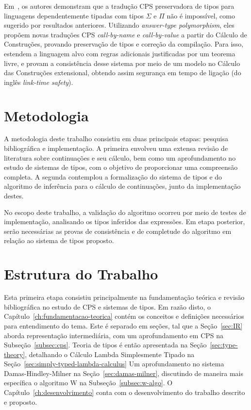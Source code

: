 Em~\cite{bowman2018cps}, os autores demonstram que a tradução CPS preservadora de tipos para linguagens dependentemente tipadas com tipos $\Sigma$ e $\Pi$ não é impossível, como sugerido por resultados anteriores.
Utilizando \textit{answer-type polymorphism}, eles propõem novas traduções CPS \textit{call-by-name} e \textit{call-by-value} a partir do Cálculo de Construções, provando preservação de tipos e correção da compilação.
Para isso, estendem a linguagem alvo com regras adicionais justificadas por um teorema livre, e provam a consistência desse sistema por meio de um modelo no Cálculo das Construções extensional, obtendo assim segurança em tempo de ligação (do inglês \textit{link-time safety}).

\section{Metodologia}\label{sec:metodologia}

A metodologia deste trabalho consistiu em duas principais etapas: pesquisa bibliográfica e implementação.
A primeira envolveu uma extensa revisão de literatura sobre continuações e seu cálculo, bem como um aprofundamento no estudo de sistemas de tipos, com o objetivo de proporcionar uma compreensão completa.
A segunda contemplou a formalização do sistema de tipos e do algoritmo de inferência para o cálculo de continuações, junto da implementação destes.

No escopo deste trabalho, a validação do algoritmo ocorreu por meio de testes de implementação, analisando os tipos inferidos das expressões.
Em etapa posterior, serão necessárias as provas de consistência e de completude do algoritmo em relação ao sistema de tipos proposto.

\section{Estrutura do Trabalho}\label{sec:estrutura-trabalho}

Esta primeira etapa consistiu principalmente na fundamentação teórica e revisão bibliográfica no estudo de CPS e sistemas de tipos.
Em razão disto, o Capítulo~\ref{ch:fundamentacao-teorica} contém os conceitos e definições necessários para entendimento do tema.
Este é separado em seções, tal que a Seção~\ref{sec:IR} aborda representação intermediária, com um aprofundamento em CPS na Subseção~\ref{subsec:cps}.
Teoria de tipos é então apresentada na Seção~\ref{sec:type-theory}, detalhando o Cálculo Lambda Simplesmente Tipado na Seção~\ref{sec:simply-typed-lambda-calculus}
Um aprofundamento no sistema Damas-Hindley-Milner na Seção~\ref{sec:damas-milner}, discutindo de maneira mais específica o algoritmo W na Subseção~\ref{subsec:w-algo}.
O Capítulo~\ref{ch:desenvolvimento} conta com o desenvolvimento do trabalho descrito e proposto.
